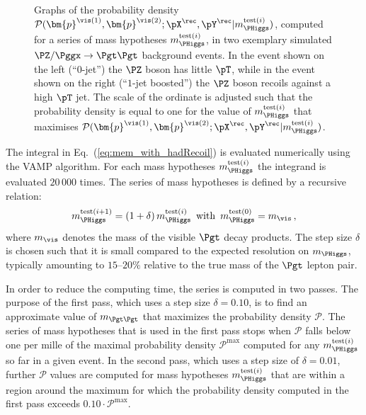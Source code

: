\begin{figure}
\begin{center}
\end{center}
\caption{
  Graphs of the probability density $\mathcal{P}(\bm{p}^{\vis(1)},\bm{p}^{\vis(2)};\pX^{\rec},\pY^{\rec}|m_{\PHiggs}^{\textrm{test}(i)})$, 
  computed for a series of mass hypotheses $m_{\PHiggs}^{\textrm{test}(i)}$, in two exemplary simulated $\PZ/\Pggx \to \Pgt\Pgt$ background events.
  In the event shown on the left (``$0$-jet'') the $\PZ$ boson has little $\pT$, while in the event shown on the right (``$1$-jet boosted'') the $\PZ$ boson recoils against a high $\pT$ jet.
  The scale of the ordinate is adjusted such that the probability density is equal to one
  for the value of $m_{\PHiggs}^{\textrm{test}(i)}$ that maximises $\mathcal{P}(\bm{p}^{\vis(1)},\bm{p}^{\vis(2)};\pX^{\rec},\pY^{\rec}|m_{\PHiggs}^{\textrm{test}(i)})$.
}
\label{fig:likelihoodGraphs}
\end{figure}

The integral in Eq.~(\ref{eq:mem_with_hadRecoil}) is evaluated numerically using the VAMP algorithm.
For each mass hypotheses $m_{\PHiggs}^{\textrm{test}(i)}$ the integrand is evaluated $20\,000$ times.
The series of mass hypotheses is defined by a recursive relation: 
\begin{equation}
m_{\PHiggs}^{\textrm{test}(i + 1)} = (1 + \delta) \,  m_{\PHiggs}^{\textrm{test}(i)} \, \mbox{ with } \, m_{\PHiggs}^{\textrm{test}(0)} = m_{\vis} \, ,
\label{eq:mTauTau_step_size}
\end{equation}
where $m_{\vis}$ denotes the mass of the visible $\Pgt$ decay products.
The step size $\delta$ is chosen such that it is small compared to the
expected resolution on $m_{\PHiggs}$,
typically amounting to $15$--$20\%$ relative to the true mass of the $\Pgt$ lepton pair.

In order to reduce the computing time, the series is computed in two passes.
The purpose of the first pass, which uses a step size $\delta = 0.10$, is to find an approximate value of $m_{\Pgt\Pgt}$
that maximizes the probability density $\mathcal{P}$.
The series of mass hypotheses that is used in the first pass stops when $\mathcal{P}$ falls below one per mille 
of the maximal probability density $\mathcal{P}^{\textrm{max}}$
computed for any $m_{\PHiggs}^{\textrm{test}(i)}$ so far in a given event.
In the second pass, which uses a step size of $\delta = 0.01$,
further $\mathcal{P}$ values 
are computed for mass hypotheses $m_{\PHiggs}^{\textrm{test}(i)}$ that
are within a region around the maximum
for which the probability density computed in the first pass exceeds
$0.10 \cdot \mathcal{P}^{\textrm{max}}$.

